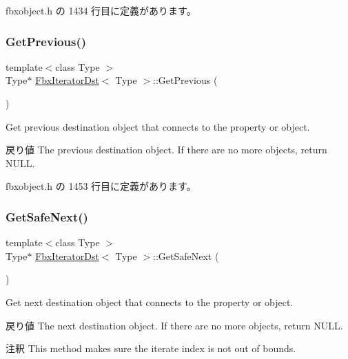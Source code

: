 fbxobject.\+h の 1434 行目に定義があります。

\mbox{\label{class_fbx_iterator_dst_a6548b31d47373fcebc51541b190d133c}} 
\subsubsection{\texorpdfstring{Get\+Previous()}{GetPrevious()}}
{\footnotesize\ttfamily template$<$class Type $>$ \\
Type$\ast$ \hyperlink{class_fbx_iterator_dst}{Fbx\+Iterator\+Dst}$<$ Type $>$\+::Get\+Previous (\begin{DoxyParamCaption}{ }\end{DoxyParamCaption})\hspace{0.3cm}{\ttfamily [inline]}}

Get previous destination object that connects to the property or object. \begin{DoxyReturn}{戻り値}
The previous destination object. If there are no more objects, return N\+U\+LL. 
\end{DoxyReturn}


 fbxobject.\+h の 1453 行目に定義があります。

\mbox{\label{class_fbx_iterator_dst_a0db8152df8a6c4be6b35e66b6d666b24}} 
\subsubsection{\texorpdfstring{Get\+Safe\+Next()}{GetSafeNext()}}
{\footnotesize\ttfamily template$<$class Type $>$ \\
Type$\ast$ \hyperlink{class_fbx_iterator_dst}{Fbx\+Iterator\+Dst}$<$ Type $>$\+::Get\+Safe\+Next (\begin{DoxyParamCaption}{ }\end{DoxyParamCaption})\hspace{0.3cm}{\ttfamily [inline]}}

Get next destination object that connects to the property or object. \begin{DoxyReturn}{戻り値}
The next destination object. If there are no more objects, return N\+U\+LL. 
\end{DoxyReturn}
\begin{DoxyRemark}{注釈}
This method makes sure the iterate index is not out of bounds. 
\end{DoxyRemark}


